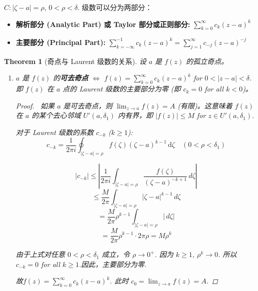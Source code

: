 \documentclass[linespread=1.5,openany]{book}%
\theoremstyle{plain}
\newtheorem{theorem}{Theorem}
\begin{document}
{{{{{{{{										$C: |\zeta-a|=\rho$, $0 < \rho < \delta$.
										级数可以分为两部分：
										\begin{itemize}
											\item \textbf{解析部分 (Analytic Part) 或 Taylor 部分或正则部分:} $\sum_{k=0}^{\infty} c_k (z-a)^k$
											\item \textbf{主要部分 (Principal Part):} $\sum_{k=-\infty}^{-1} c_k (z-a)^k = \sum_{j=1}^{\infty} c_{-j} (z-a)^{-j}$
										\end{itemize}
										
										\begin{theorem}[奇点与 Laurent 级数的关系] \label{thm:L16_singularities_laurent}
											设 $a$ 是 $f(z)$ 的孤立奇点。
											\begin{enumerate}[label=\arabic*)]
												\item $a$ 是 $f(z)$ 的\textbf{可去奇点} $\iff$ $f(z) = \sum_{k=0}^{\infty} c_k (z-a)^k$ for $0 < |z-a| < \delta$.即 $f(z)$ 在 $a$ 点的 Laurent 级数的主要部分为零 (即 $c_k=0$ for all $k < 0$)。
												
												\begin{proof}\
													如果 $a$ 是可去奇点，则 $\lim_{z\to a} f(z) = A$ (有限)。这意味着 $f(z)$ 在 $a$ 的某个去心邻域 $U'(a,\delta_1)$ 内有界，即 $|f(z)| \le M$ for $z \in U'(a,\delta_1)$.
													
													对于 Laurent 级数的系数 $c_{-k}$ ($k \ge 1$):
													\[
													c_{-k} = \frac{1}{2\pi i} \oint_{|\zeta-a|=\rho} f(\zeta)(\zeta-a)^{k-1} \, \mathrm{d}\zeta \quad (0 < \rho < \delta_1)
													\]	
													
													\[
													|c_{-k}| \leq \left| \frac{1}{2\pi i} \int_{|\zeta-a|=\rho} \frac{f(\zeta)}{(\zeta-a)^{-k+1}} \,d\zeta \right|
													\]
													\[
													\leq \frac{M}{2\pi} \int_{|\zeta-a|=\rho} |\zeta-a|^{k-1} \,d\zeta
													\]
													\[
													= \frac{M}{2\pi} \rho^{k-1} \int_{|\zeta-a|=\rho} |\,d\zeta|
													\]
													\[
													= \frac{M}{2\pi} \rho^{k-1} \cdot 2\pi \rho = M \rho^k
													\]
													
													
													
													
													由于上式对任意 $0 < \rho < \delta_1$ 成立，令 $\rho \to 0^+$. 因为 $k \ge 1$, $\rho^k \to 0$.
													所以 $c_{-k}=0$ for all $k \ge 1$.因此，主要部分为零. 
													
													故$f(z) = \sum_{k=0}^{\infty} c_k (z-a)^k$.	此时 $c_0 = \lim_{z\to a} f(z) = A$.
												\end{proof}
												

\end{enumerate}
\end{theorem}}}}}}}}}
\end{document}
